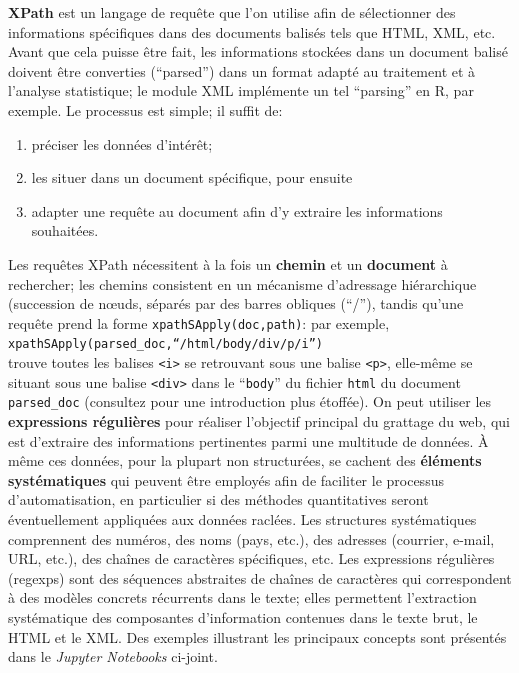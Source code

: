 \textbf{XPath} est un langage de requête  que l'on utilise afin de sélectionner des informations spécifiques dans des documents balisés tels que HTML, XML, etc. Avant que cela puisse être fait, les informations stockées dans un document balisé doivent être converties (``parsed'') dans un format adapté au traitement et à l'analyse statistique; le module XML implémente un tel ``parsing'' en R, par exemple. Le processus est simple; il suffit de: 
\begin{enumerate}[noitemsep]
\item préciser les données d'intérêt;
\item les situer dans un document spécifique, pour ensuite 
\item adapter une requête au document afin d'y extraire les informations souhaitées.
\end{enumerate}
Les requêtes XPath nécessitent à la fois un \textbf{chemin} et un \textbf{document} à rechercher; les chemins consistent en un mécanisme d'adressage hiérarchique (succession de nœuds, séparés par des barres obliques (``/''), tandis qu'une requête prend la forme \small\texttt{xpathSApply(doc,path)}\normalsize: par exemple,
\footnotesize\texttt{xpathSApply(parsed\_doc,``/html/body/div/p/i'')}\normalsize \\ trouve toutes les balises \texttt{<i>} se retrouvant sous une balise \texttt{<p>}, elle-m\^eme se situant sous une balise \texttt{<div>} dans le ``\texttt{body}'' du fichier \texttt{html} du document \texttt{parsed\_doc} (consultez \cite{DC_MRMN} pour une introduction plus étoffée). 
\newl On peut utiliser les \textbf{expressions régulières} pour réaliser l'objectif principal du grattage du web, qui est d'extraire des informations pertinentes parmi une multitude de données. \`A m\^eme ces données, pour la plupart non structurées, se cachent des \textbf{éléments systématiques} qui peuvent être employés afin de faciliter le processus d'automatisation, en particulier si des méthodes quantitatives seront éventuellement appliquées aux données raclées. Les structures systématiques comprennent des numéros, des noms (pays, etc.), des adresses (courrier, e-mail, URL, etc.), des chaînes de caractères spécifiques, etc. Les expressions régulières (regexps) sont des séquences abstraites de chaînes de caractères qui correspondent à des modèles concrets récurrents dans le texte; elles permettent l'extraction systématique des composantes d'information contenues  dans le texte brut, le HTML et le XML. Des exemples illustrant les principaux concepts sont présentés dans le \textit{Jupyter Notebooks} ci-joint. %
